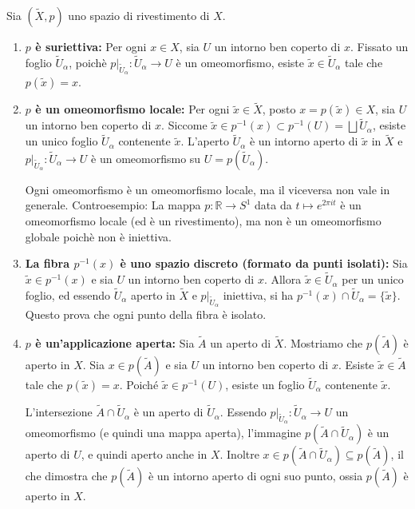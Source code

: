 \begin{prop}
Sia $(\widetilde{X}, p)$ uno spazio di rivestimento di $X$.
\begin{enumerate}
    \item \textbf{$p$ è suriettiva:}
    Per ogni $x \in X$, sia $U$ un intorno ben coperto di $x$. Fissato un foglio $\widetilde{U}_\alpha$, poichè $p|_{\widetilde{U}_\alpha}: \widetilde{U}_\alpha \to U$ è un omeomorfismo, esiste $\widetilde{x} \in \widetilde{U}_\alpha$ tale che $p(\widetilde{x}) = x$.

    \item \textbf{$p$ è un omeomorfismo locale:}
    Per ogni $\widetilde{x} \in \widetilde{X}$, posto $x = p(\widetilde{x}) \in X$, sia $U$ un intorno ben coperto di $x$.
    Siccome $\widetilde{x} \in p^{-1}(x) \subset p^{-1}(U) = \bigsqcup \widetilde{U}_\alpha$, esiste un unico foglio $\widetilde{U}_\alpha$ contenente $\widetilde{x}$.
    L'aperto $\widetilde{U}_\alpha$ è un intorno aperto di $\widetilde{x}$ in $\widetilde{X}$ e $p|_{\widetilde{U}_\alpha}: \widetilde{U}_\alpha \to U$ è un omeomorfismo su $U = p(\widetilde{U}_\alpha)$.

    \begin{observacion}
    Ogni omeomorfismo è un omeomorfismo locale, ma il viceversa non vale in generale.
    Controesempio: La mappa $p: \mathbb{R} \to S^1$ data da $t \mapsto e^{2\pi i t}$ è un omeomorfismo locale (ed è un rivestimento), ma non è un omeomorfismo globale poichè non è iniettiva.
    \end{observacion}

    \item \textbf{La fibra $p^{-1}(x)$ è uno spazio discreto (formato da punti isolati):}
    Sia $\widetilde{x} \in p^{-1}(x)$ e sia $U$ un intorno ben coperto di $x$.
    Allora $\widetilde{x} \in \widetilde{U}_\alpha$ per un unico foglio, ed essendo $\widetilde{U}_\alpha$ aperto in $\widetilde{X}$ e $p|_{\widetilde{U}_\alpha}$ iniettiva, si ha $p^{-1}(x) \cap \widetilde{U}_\alpha = \{\widetilde{x}\}$.
    Questo prova che ogni punto della fibra è isolato.

    \item \textbf{$p$ è un'applicazione aperta:}
    Sia $\widetilde{A}$ un aperto di $\widetilde{X}$. Mostriamo che $p(\widetilde{A})$ è aperto in $X$.
    Sia $x \in p(\widetilde{A})$ e sia $U$ un intorno ben coperto di $x$.
    Esiste $\widetilde{x} \in \widetilde{A}$ tale che $p(\widetilde{x}) = x$. Poiché $\widetilde{x} \in p^{-1}(U)$, esiste un foglio $\widetilde{U}_\alpha$ contenente $\widetilde{x}$.
    
    L'intersezione $\widetilde{A} \cap \widetilde{U}_\alpha$ è un aperto di $\widetilde{U}_\alpha$.
    Essendo $p|_{\widetilde{U}_\alpha}: \widetilde{U}_\alpha \to U$ un omeomorfismo (e quindi una mappa aperta), l'immagine $p(\widetilde{A} \cap \widetilde{U}_\alpha)$ è un aperto di $U$, e quindi aperto anche in $X$.
    Inoltre $x \in p(\widetilde{A} \cap \widetilde{U}_\alpha) \subseteq p(\widetilde{A})$, il che dimostra che $p(\widetilde{A})$ è un intorno aperto di ogni suo punto, ossia $p(\widetilde{A})$ è aperto in $X$.
\end{enumerate}
\end{prop}

